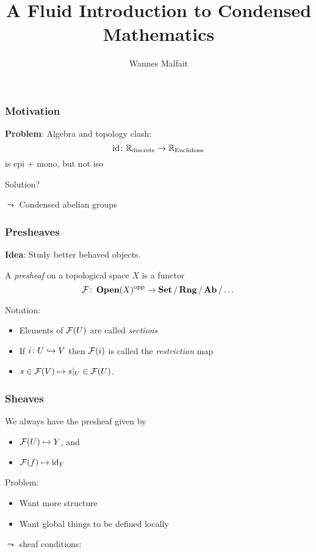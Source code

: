 \documentclass{beamer}
\title{A Fluid Introduction to Condensed Mathematics}
\author{Wannes Malfait}
\date{}
\DeclareMathOperator{\Open}{\mathbf{Open}}
\DeclareMathOperator{\opp}{opp}
\DeclareMathOperator{\id}{id}
\begin{document}
\maketitle

\begin{frame}
    \frametitle{Motivation}

    \textbf{Problem}: Algebra and topology clash:
    \begin{equation*}
        \id \colon \bbR_{\text{discrete}} \to \bbR_{\text{Euclidean}}
    \end{equation*}
    is epi + mono, but not iso

    \medskip
    Solution?
    \pause

    $\leadsto$ Condensed abelian groups
\end{frame}

\begin{frame}
    \frametitle{Presheaves}

    \textbf{Idea}: Study better behaved objects.
    \pause

    \begin{definition}
        A \emph{presheaf} on a topological space $X$
        is a functor
        \begin{equation*}
            \mcF \colon \Open(X)^{\opp} \to \Set / \Rng / \Ab / \dots
        \end{equation*}
    \end{definition}
    Notation:
    \begin{itemize}
        \item Elements of $\mathcal{F}(U)$ are called \emph{sections}
        \item If $ i \colon U\hookrightarrow V$ then $\mathcal{F}(i)$ is
              called the \emph{restriction} map
        \item $s\in \mathcal{F}(V) \mapsto s|_U \in \mathcal{F}(U)$.
    \end{itemize}

\end{frame}

\begin{frame}
    \frametitle{Sheaves}

    \begin{example}
        We always have the presheaf given by
        \begin{itemize}
            \item $\mathcal{F}(U) \mapsto Y$, and
            \item $\mcF(f) \mapsto \id_Y$
        \end{itemize}
    \end{example}
    \pause
    Problem:
    \begin{itemize}
        \item Want more structure
        \item Want global things to be defined locally
    \end{itemize}
    $\leadsto$ sheaf conditions:

\end{frame}
\end{document}
